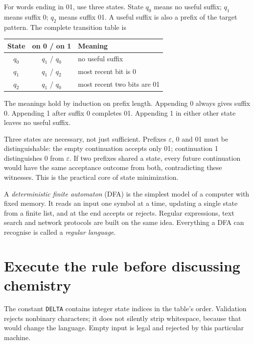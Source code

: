 For words ending in 01, use three states. State $q_0$ means no useful suffix;
$q_1$ means suffix 0; $q_2$ means suffix 01. A useful suffix is also a prefix
of the target pattern. The complete transition table is
\begin{center}
\begin{tabular}{ccl}\toprule
State & on 0 / on 1 & Meaning\\\midrule
$q_0$ & $q_1$ / $q_0$ & no useful suffix\\
$q_1$ & $q_1$ / $q_2$ & most recent bit is 0\\
$q_2$ & $q_1$ / $q_0$ & most recent two bits are 01\\\bottomrule
\end{tabular}
\end{center}

The meanings hold by induction on prefix length. Appending 0 always gives
suffix 0. Appending 1 after suffix 0 completes 01. Appending 1 in either other
state leaves no useful suffix.

Three states are necessary, not just sufficient. Prefixes $\varepsilon$, 0
and 01 must be distinguishable: the empty continuation accepts only 01;
continuation 1 distinguishes 0 from $\varepsilon$. If two prefixes shared a
state, every future continuation would have the same acceptance outcome from
both, contradicting these witnesses. This is the practical core of
state minimization.

\begin{CSBridge}
A \emph{deterministic finite automaton} (DFA) is the simplest model of a
computer with fixed memory. It reads an input one symbol at a time, updating a
single state from a finite list, and at the end accepts or rejects. Regular
expressions, text search and network protocols are built on the same idea.
Everything a DFA can recognise is called a \emph{regular language}.
\end{CSBridge}

\section{Execute the rule before discussing chemistry}
The constant \texttt{DELTA} contains integer state indices in the table's order.
Validation rejects nonbinary characters; it does not silently strip whitespace,
because that would change the language. Empty input is legal and rejected by
this particular machine.
\begin{center}\end{center}

